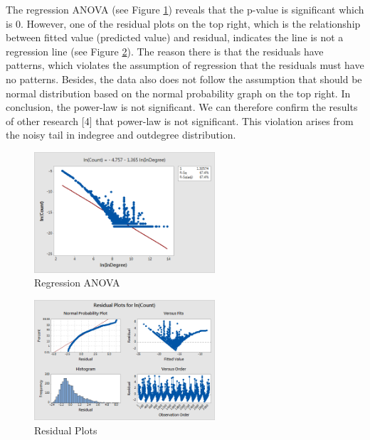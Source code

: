 The regression ANOVA (see Figure \ref{fig14}) reveals that the p-value is significant which is 0. However, one of the residual plots on the top right, which is the relationship between fitted value (predicted value) and residual, indicates the line is not a regression line (see Figure \ref{fig15}). The reason there is that the residuals have patterns, which violates the assumption of regression that the residuals must have no patterns. Besides, the data also does not follow the assumption that should be normal distribution based on the normal probability graph on the top right. In conclusion, the power-law is not significant. We can therefore confirm the results of other research [4] that power-law is not significant. This violation arises from the noisy tail in indegree and outdegree distribution.

\begin{figure}[H]
	\begin{center}
		\caption{Regression ANOVA}		
		\label{fig14}		
		\includegraphics[width=0.6\textwidth]{fig14}	
	\end{center}
\end{figure}	
\begin{figure}[H]	
	\begin{center}
		\caption{Residual Plots}		
		\label{fig15}		
		\includegraphics[width=0.6\textwidth]{fig15}	
	\end{center}
\end{figure}


